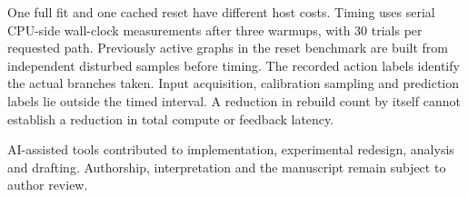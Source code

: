 \documentclass[10pt]{article}
\begin{document}
One full fit and one cached reset have different host costs. Timing uses serial CPU-side wall-clock measurements after three warmups, with 30 trials per requested path. Previously active graphs in the reset benchmark are built from independent disturbed samples before timing. The recorded action labels identify the actual branches taken. Input acquisition, calibration sampling and prediction labels lie outside the timed interval. A reduction in rebuild count by itself cannot establish a reduction in total compute or feedback latency.

AI-assisted tools contributed to implementation, experimental redesign, analysis and drafting. Authorship, interpretation and the manuscript remain subject to author review.
\end{document}
